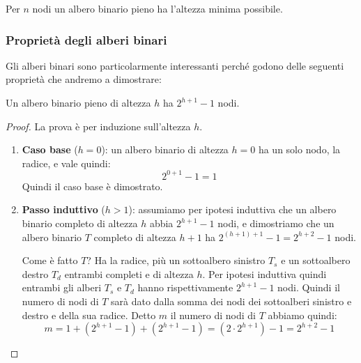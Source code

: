 
\begin{osservation}
Per $n$ nodi un albero binario pieno ha l'altezza minima possibile.
\end{osservation}



\subsubsection{Proprietà degli alberi binari}\label{alberi_binari_prop}
Gli alberi binari sono particolarmente interessanti perché godono delle seguenti proprietà che andremo a dimostrare:


\begin{propbox}
Un albero binario pieno di altezza $h$ ha $2^{h+1}-1$ nodi.
\end{propbox}
\begin{proof}
La prova è per induzione sull'altezza $h$.
\begin{enumerate}
	\item \textbf{Caso base} ($h=0$): un albero binario di altezza $h=0$ ha un solo nodo, la radice, e vale quindi:
	\begin{displaymath}
		2^{0+1}-1 = 1
	\end{displaymath}
Quindi il caso base è dimostrato.
\item \textbf{Passo induttivo} ($h > 1$): assumiamo per ipotesi induttiva che un albero binario completo di altezza $h$ abbia $2^{h+1}-1$ nodi, e dimostriamo che un albero binario $T$ completo di altezza $h+1$ ha $2^{(h+1)+1}-1=2^{h+2}-1$ nodi.

Come è fatto $T$? Ha la radice, più un sottoalbero sinistro $T_{s}$ e un sottoalbero destro $T_{d}$ entrambi completi e di altezza $h$. Per ipotesi induttiva quindi entrambi gli alberi $T_{s}$ e $T_{d}$ hanno rispettivamente $2^{h+1}-1$ nodi. Quindi il numero di nodi di $T$ sarà dato dalla somma dei nodi dei sottoalberi sinistro e destro e della sua radice. Detto $m$ il numero di nodi di $T$ abbiamo quindi:
\begin{displaymath}
	m = 1 + (2^{h+1}-1) + (2^{h+1}-1) = (2 \cdot 2^{h+1}) -1 = 2^{h+2}-1
\end{displaymath}
\end{enumerate}
\end{proof}


